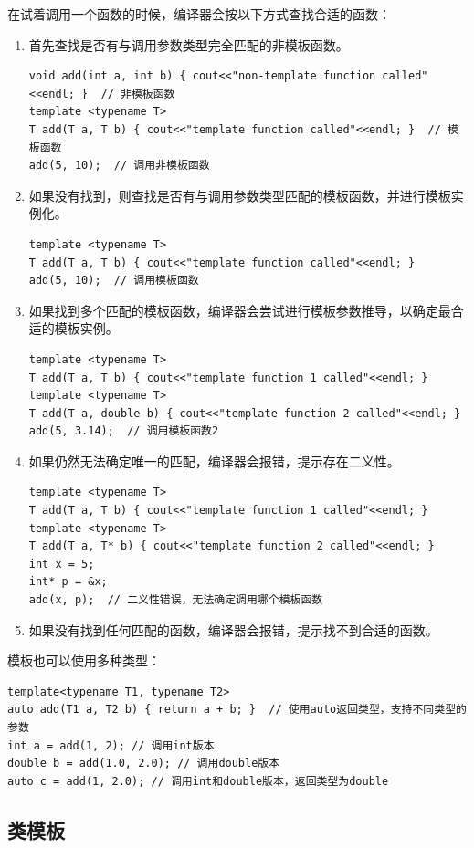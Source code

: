 在试着调用一个函数的时候，编译器会按以下方式查找合适的函数：
\begin{enumerate}
    \item 首先查找是否有与调用参数类型完全匹配的非模板函数。
    \begin{verbatim}
void add(int a, int b) { cout<<"non-template function called"<<endl; }  // 非模板函数
template <typename T>
T add(T a, T b) { cout<<"template function called"<<endl; }  // 模板函数
add(5, 10);  // 调用非模板函数
    \end{verbatim}
    \item 如果没有找到，则查找是否有与调用参数类型匹配的模板函数，并进行模板实例化。
    \begin{verbatim}
template <typename T>
T add(T a, T b) { cout<<"template function called"<<endl; }
add(5, 10);  // 调用模板函数
    \end{verbatim}
    \item 如果找到多个匹配的模板函数，编译器会尝试进行模板参数推导，以确定最合适的模板实例。
    \begin{verbatim}
template <typename T>
T add(T a, T b) { cout<<"template function 1 called"<<endl; }
template <typename T>
T add(T a, double b) { cout<<"template function 2 called"<<endl; }
add(5, 3.14);  // 调用模板函数2
    \end{verbatim}
    \item 如果仍然无法确定唯一的匹配，编译器会报错，提示存在二义性。
    \begin{verbatim}
template <typename T>
T add(T a, T b) { cout<<"template function 1 called"<<endl; }
template <typename T>
T add(T a, T* b) { cout<<"template function 2 called"<<endl; }
int x = 5;
int* p = &x;
add(x, p);  // 二义性错误，无法确定调用哪个模板函数
    \end{verbatim}
    \item 如果没有找到任何匹配的函数，编译器会报错，提示找不到合适的函数。
\end{enumerate}

模板也可以使用多种类型：
\begin{verbatim}
template<typename T1, typename T2>
auto add(T1 a, T2 b) { return a + b; }  // 使用auto返回类型，支持不同类型的参数
int a = add(1, 2); // 调用int版本
double b = add(1.0, 2.0); // 调用double版本
auto c = add(1, 2.0); // 调用int和double版本，返回类型为double
\end{verbatim}

\subsection{类模板}

